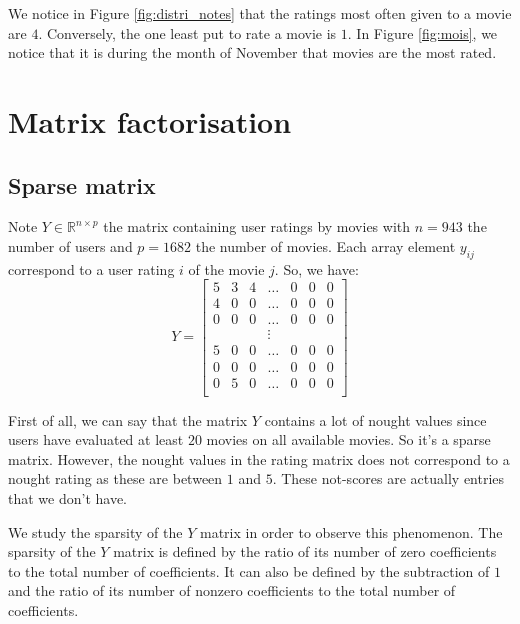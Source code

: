 \documentclass{article}
\begin{document}
We notice in Figure \ref{fig:distri_notes} that the ratings most often given to a movie are $4$. Conversely, the one least put to rate a movie is $1$. In Figure \ref{fig:mois}, we notice that it is during the month of November that movies are the most rated.

\section{Matrix factorisation}
\subsection{Sparse matrix}
Note
$Y \in \mathbb{R}^{n \times p}$ the matrix containing user ratings by movies with $n=943$ the number of users and $p=1682$ the number of movies. Each array element $y_{ij}$ correspond to a user rating $i$ of the movie $j$. So, we have:
$$Y=\begin{bmatrix}
5 & 3 & 4 & \dots & 0 & 0 & 0\\
4 & 0 & 0 & \dots & 0 & 0 & 0\\
0 & 0 & 0 & \dots & 0 & 0 & 0\\
  &   &   & \vdots\\
5 & 0 & 0 & \dots & 0 & 0 & 0\\
0 & 0 & 0 & \dots & 0 & 0 & 0\\
0 & 5 & 0 & \dots & 0 & 0 & 0\\
\end{bmatrix}$$

First of all, we can say that the matrix $Y$ contains a lot of nought values since users have evaluated at least $20$ movies on all available movies. So it’s a sparse matrix.
However, the nought values in the rating matrix does not correspond to a nought rating as these are between $1$ and $5$. These not-scores are actually entries that we don’t have.

We study the sparsity of the $Y$ matrix in order to observe this phenomenon. The sparsity of the $Y$ matrix is defined by the ratio of its number of zero coefficients to the total number of coefficients. It can also be defined by the subtraction of $1$ and the ratio of its number of nonzero coefficients to the total number of coefficients.
\end{document}
